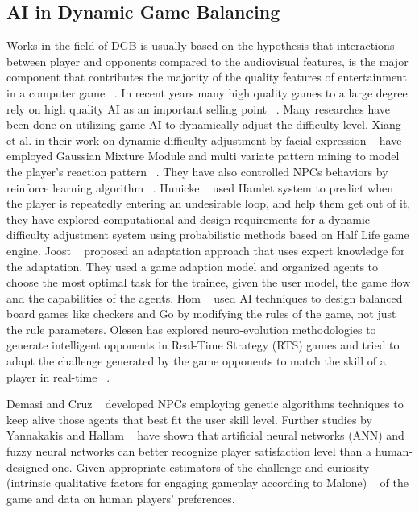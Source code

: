 \subsection{AI in Dynamic Game Balancing}
Works in the field of DGB is usually based on the hypothesis that interactions between player and opponents compared to the audiovisual features, is the major component that contributes the majority of the quality features of entertainment in a computer game ~\cite{schaalevolving}. In recent years many high quality games to a large degree rely on high quality AI as an important selling point ~\cite{forbus2002ai}. Many researches have been done on utilizing game AI to dynamically adjust the difficulty level. Xiang et al. in their work on dynamic difficulty adjustment by facial expression ~\cite{xiang2013dynamic} have employed Gaussian Mixture Module and multi variate pattern mining to model the player's reaction pattern ~\cite{lee2006dynamic, chiu2008using}. They have also controlled NPCs behaviors by reinforce learning algorithm ~\cite{spronck2004difficulty, andrade2005challenge}. Hunicke ~\cite{hunicke2004ai} used Hamlet system to predict when the player is repeatedly entering an undesirable loop, and help them get out of it, they have explored computational and design requirements for a dynamic difficulty adjustment system using probabilistic methods based on Half Life game engine. Joost ~\cite{westra2009adaptive} proposed an adaptation approach that uses expert knowledge for the adaptation. They used a game adaption model and organized agents to choose the most optimal task for the trainee, given the user model, the game flow and the capabilities of the agents. Hom ~\cite{hom2007automatic} used AI techniques to design balanced board games like checkers and Go by modifying the rules of the game, not just the rule parameters. Olesen has explored neuro-evolution methodologies to generate intelligent opponents in Real-Time Strategy (RTS) games and tried to adapt the challenge generated by the game opponents to match the skill of a player in real-time ~\cite{olesen2008real}.

Demasi and Cruz ~\cite{demasi2003line} developed NPCs employing genetic algorithms techniques to keep alive those agents that best fit the user skill level. Further studies by Yannakakis and Hallam ~\cite{yannakakis2006towards} have shown that artificial neural networks (ANN) and fuzzy neural networks can better recognize player satisfaction level than a human-designed one. Given appropriate estimators of the challenge and curiosity (intrinsic qualitative factors for engaging gameplay according to Malone) ~\cite{malone1982makes} of the game and data on human players' preferences.

